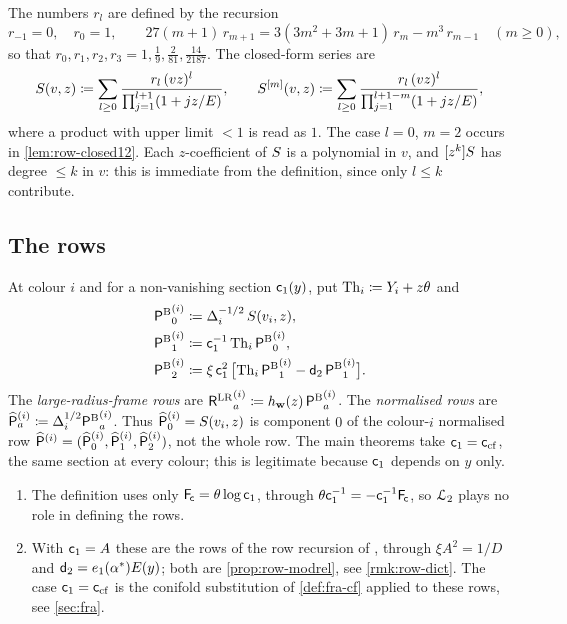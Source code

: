 The numbers $r_l$ are defined by the recursion
\begin{equation}
\label{eq:set-rec}
r_{-1}=0,\quad r_0=1,\qquad 27(m+1)\,r_{m+1}=3(3m^2+3m+1)\,r_m-m^3\,r_{m-1}\quad(m\geq0),
\end{equation}
so that $r_0,r_1,r_2,r_3=1,\frac19,\frac2{81},\frac{14}{2187}$. The closed-form series are
\begin{equation}
\label{eq:set-S}
S(v,z)\coloneqq\sum_{l\geq0}\frac{r_l\,(vz)^l}{\prod_{j=1}^{l+1}(1+jz/E)},\qquad
S^{[m]}(v,z)\coloneqq\sum_{l\geq0}\frac{r_l\,(vz)^l}{\prod_{j=1}^{l+1-m}(1+jz/E)},
\end{equation}
where a product with upper limit $<1$ is read as $1$. The case $l=0$, $m=2$ occurs in \cref{lem:row-closed12}. Each $z$-coefficient of $S$ is a polynomial in $v$, and $[z^k]S$ has degree $\leq k$ in $v$: this is immediate from the definition, since only $l\leq k$ contribute.

\subsection{The rows}
\label{sec:set-rows}

\begin{defn}
\label{def:set-rows}
At colour $i$ and for a non-vanishing section $\mathsf{c}_{1}(y)$, put $\mathrm{Th}_i\coloneqq Y_i+z\theta$ and
\begin{align*}
{\mathsf{P}^{\mathrm{B}}}_0^{(i)}&\coloneqq\Delta_i^{-1/2}\,S(v_i,z),\\
{\mathsf{P}^{\mathrm{B}}}_1^{(i)}&\coloneqq\mathsf{c}_{1}^{-1}\,\mathrm{Th}_i\,{\mathsf{P}^{\mathrm{B}}}_0^{(i)},\\
{\mathsf{P}^{\mathrm{B}}}_2^{(i)}&\coloneqq\xi\,\mathsf{c}_{1}^{2}\,\big[\mathrm{Th}_i\,{\mathsf{P}^{\mathrm{B}}}_1^{(i)}-\mathsf{d}_{2}\,{\mathsf{P}^{\mathrm{B}}}_1^{(i)}\big].
\end{align*}
The \emph{large-radius-frame rows} are ${\mathsf{R}^{\mathrm{LR}}}_a^{(i)}\coloneqq h_{\mathbf{w}}(z)\,{\mathsf{P}^{\mathrm{B}}}_a^{(i)}$. The \emph{normalised rows} are $\widehat{\mathsf{P}}_a^{(i)}\coloneqq\Delta_i^{1/2}{\mathsf{P}^{\mathrm{B}}}_a^{(i)}$. Thus $\widehat{\mathsf{P}}_0^{(i)}=S(v_i,z)$ is component $0$ of the colour-$i$ normalised row $\widehat{\mathsf{P}}^{(i)}=(\widehat{\mathsf{P}}_0^{(i)},\widehat{\mathsf{P}}_1^{(i)},\widehat{\mathsf{P}}_2^{(i)})$, not the whole row. The main theorems take $\mathsf{c}_{1}=\mathsf{c}_{\mathrm{cf}}$, the same section at every colour; this is legitimate because $\mathsf{c}_{1}$ depends on $y$ only.
\end{defn}

\begin{rmk}
\begin{enumerate}
\item The definition uses only $\mathsf{F}_{\!\mathsf{c}}=\theta\log\mathsf{c}_{1}$, through $\theta\mathsf{c}_{1}^{-1}=-\mathsf{c}_{1}^{-1}\mathsf{F}_{\!\mathsf{c}}$, so $\mathcal{L}_{2}$ plays no role in defining the rows.
\item With $\mathsf{c}_{1}=A$ these are the rows of the row recursion of \cite{BS}, through $\xi A^2=1/D$ and $\mathsf{d}_{2}=e_1(\alpha^*)E(y)$; both are \cref{prop:row-modrel}, see \cref{rmk:row-dict}. The case $\mathsf{c}_{1}=\mathsf{c}_{\mathrm{cf}}$ is the conifold substitution of \cref{def:fra-cf} applied to these rows, see \cref{sec:fra}. 
\end{enumerate}
\end{rmk}

